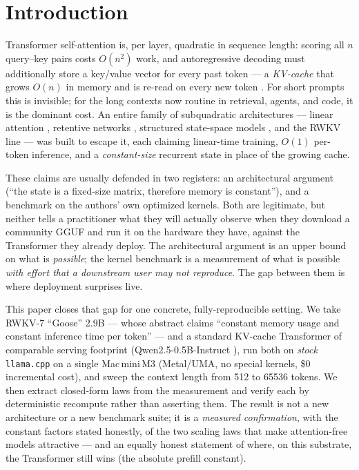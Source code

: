 \documentclass[11pt,a4paper]{article}
\newcommand{\ctx}{\ensuremath{n}}
\begin{document}
\section{Introduction}
\label{sec:intro}

Transformer self-attention is, per layer, quadratic in sequence length: scoring
all \(\ctx\) query--key pairs costs \(O(\ctx^2)\) work, and autoregressive
decoding must additionally store a key/value vector for every past token --- a
\emph{KV-cache} that grows \(O(\ctx)\) in memory and is re-read on every new
token \citep{vaswani2017attention}. For short prompts this is invisible; for the
long contexts now routine in retrieval, agents, and code, it is the dominant
cost. An entire family of subquadratic architectures --- linear attention
\citep{katharopoulos2020transformers}, retentive networks
\citep{sun2023retnet}, structured state-space models \citep{gu2023mamba}, and the
RWKV line \citep{peng2023rwkv,peng2025rwkv7} --- was built to escape it, each
claiming linear-time training, \(O(1)\) per-token inference, and a
\emph{constant-size} recurrent state in place of the growing cache.

These claims are usually defended in two registers: an architectural argument
(``the state is a fixed-size matrix, therefore memory is constant''), and a
benchmark on the authors' own optimized kernels. Both are legitimate, but
neither tells a practitioner what they will actually observe when they download
a community GGUF and run it on the hardware they have, against the Transformer
they already deploy. The architectural argument is an upper bound on what is
\emph{possible}; the kernel benchmark is a measurement of what is possible
\emph{with effort that a downstream user may not reproduce}. The gap between them
is where deployment surprises live.

This paper closes that gap for one concrete, fully-reproducible setting. We take
RWKV-7 ``Goose'' 2.9B \citep{peng2025rwkv7} --- whose abstract claims ``constant
memory usage and constant inference time per token'' --- and a standard
KV-cache Transformer of comparable serving footprint (Qwen2.5-0.5B-Instruct
\citep{qwen25}), run both on \emph{stock} \texttt{llama.cpp}
\citep{llamacpp} on a single Mac\,mini\,M3 (Metal/UMA, no special kernels, \$0
incremental cost), and sweep the context length from \num{512} to \num{65536}
tokens. We then extract closed-form laws from the measurement and verify each by
deterministic recompute rather than asserting them. The result is not a new
architecture or a new benchmark suite; it is a \emph{measured confirmation},
with the constant factors stated honestly, of the two scaling laws that make
attention-free models attractive --- and an equally honest statement of where,
on this substrate, the Transformer still wins (the absolute prefill constant).
\end{document}
